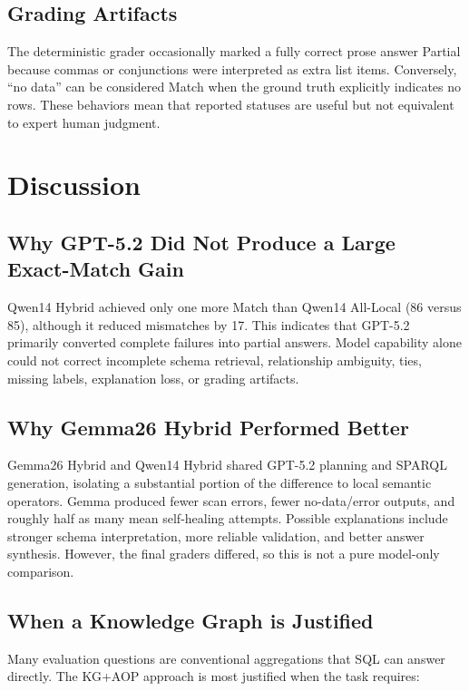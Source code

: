 \documentclass[11pt]{article}
\begin{document}
\subsection{Grading Artifacts}

The deterministic grader occasionally marked a fully correct prose answer Partial because commas or conjunctions were interpreted as extra list items. Conversely, ``no data'' can be considered Match when the ground truth explicitly indicates no rows. These behaviors mean that reported statuses are useful but not equivalent to expert human judgment.

\section{Discussion}

\subsection{Why GPT-5.2 Did Not Produce a Large Exact-Match Gain}

Qwen14 Hybrid achieved only one more Match than Qwen14 All-Local (86 versus 85), although it reduced mismatches by 17. This indicates that GPT-5.2 primarily converted complete failures into partial answers. Model capability alone could not correct incomplete schema retrieval, relationship ambiguity, ties, missing labels, explanation loss, or grading artifacts.

\subsection{Why Gemma26 Hybrid Performed Better}

Gemma26 Hybrid and Qwen14 Hybrid shared GPT-5.2 planning and SPARQL generation, isolating a substantial portion of the difference to local semantic operators. Gemma produced fewer scan errors, fewer no-data/error outputs, and roughly half as many mean self-healing attempts. Possible explanations include stronger schema interpretation, more reliable validation, and better answer synthesis. However, the final graders differed, so this is not a pure model-only comparison.

\subsection{When a Knowledge Graph is Justified}

Many evaluation questions are conventional aggregations that SQL can answer directly. The KG+AOP approach is most justified when the task requires:
\end{document}
